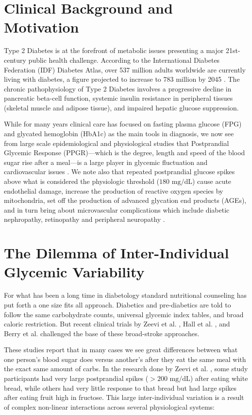 \label{chap:introduction}

\section{Clinical Background and Motivation}
Type 2 Diabetes is at the forefront of metabolic issues presenting a major 21st-century public health challenge. According to the International Diabetes Federation (IDF) Diabetes Atlas, over 537 million adults worldwide are currently living with diabetes, a figure projected to increase to 783 million by 2045 \cite{idf2021}. The chronic pathophysiology of Type 2 Diabetes involves a progressive decline in pancreatic beta-cell function, systemic insulin resistance in peripheral tissues (skeletal muscle and adipose tissue), and impaired hepatic glucose suppression.

While for many years clinical care has focused on fasting plasma glucose (FPG) and glycated hemoglobin (HbA1c) as the main tools in diagnosis, we now see from large scale epidemiological and physiological studies that Postprandial Glycemic Response (PPGR)—which is the degree, length and speed of the blood sugar rise after a meal—is a large player in glycemic fluctuation and cardiovascular issues \cite{brownlee2005pathobiology}. We note also that repeated postprandial glucose spikes above what is considered the physiologic threshold ($180\text{ mg/dL}$) cause acute endothelial damage, increase the production of reactive oxygen species by mitochondria, set off the production of advanced glycation end products (AGEs), and in turn bring about microvascular complications which include diabetic nephropathy, retinopathy and peripheral neuropathy \cite{brownlee2005pathobiology}.

\section{The Dilemma of Inter-Individual Glycemic Variability}
For what has been a long time in diabetology standard nutritional counseling has put forth a one size fits all approach. Diabetics and pre-diabetics are told to follow the same carbohydrate counts, universal glycemic index tables, and broad caloric restriction. But recent clinical trials by Zeevi et al. \cite{zeevi2015personalized}, Hall et al. \cite{hall2018glucotypes}, and Berry et al. \cite{berry2020human} challenged the base of these broad-stroke approaches.

These studies report that in many cases we see great differences between what one person's blood sugar does versus another's after they eat the same meal with the exact same amount of carbs. In the research done by Zeevi et al. \cite{zeevi2015personalized}, some study participants had very large postprandial spikes ($>200\text{ mg/dL}$) after eating white bread, while others had very little response to that bread but had large spikes after eating fruit high in fructose. This large inter-individual variation is a result of complex non-linear interactions across several physiological systems:

